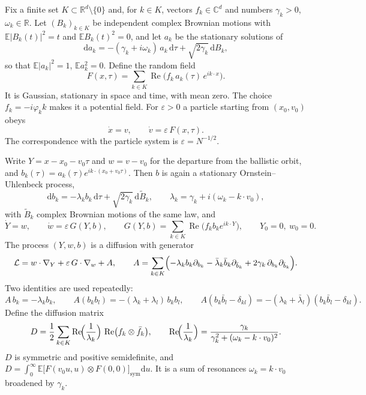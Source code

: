 \documentclass[11pt]{article}
\newcommand{\dd}{\mathrm{d}}
\newcommand{\E}{\mathbb{E}}
\newcommand{\eps}{\varepsilon}
\newcommand{\cL}{\mathcal{L}}
\renewcommand{\Re}{\operatorname{Re}}
\theoremstyle{remark}
\begin{document}
Fix a finite set $K\subset\mathbb{R}^d\setminus\{0\}$ and, for $k\in K$,
vectors $f_k\in\mathbb{C}^d$ and numbers $\gamma_k>0$, $\omega_k\in\mathbb{R}$.
Let $(B_k)_{k\in K}$ be independent complex Brownian motions with
$\E|B_k(t)|^2 = t$ and $\E B_k(t)^2 = 0$, and let $a_k$ be the stationary
solutions of
\[
  \dd a_k = -(\gamma_k + i\omega_k)\,a_k\,\dd\tau + \sqrt{2\gamma_k}\,\dd B_k ,
\]
so that $\E|a_k|^2 = 1$, $\E a_k^2 = 0$. Define the random field
\begin{equation}
  F(x,\tau) = \sum_{k\in K}\Re\bigl(f_k\,a_k(\tau)\,e^{ik\cdot x}\bigr).
\end{equation}
It is Gaussian, stationary in space and time, with mean zero. The choice
$f_k = -i\varphi_k k$ makes it a potential field. For $\eps>0$ a particle
starting from $(x_0,v_0)$ obeys
\begin{equation}
  \dot x = v, \qquad \dot v = \eps\,F(x,\tau).
\end{equation}
The correspondence with the particle system is $\eps = N^{-1/2}$.

Write $Y = x - x_0 - v_0\tau$ and $w = v - v_0$ for the departure from the
ballistic orbit, and $b_k(\tau) = a_k(\tau)e^{ik\cdot(x_0+v_0\tau)}$. Then
$b$ is again a stationary Ornstein--Uhlenbeck process,
\begin{equation}
  \dd b_k = -\lambda_k b_k\,\dd\tau + \sqrt{2\gamma_k}\,\dd\tilde B_k,
  \qquad \lambda_k = \gamma_k + i(\omega_k - k\cdot v_0),
\end{equation}
with $\tilde B_k$ complex Brownian motions of the same law, and
\begin{equation}
  \dot Y = w, \qquad \dot w = \eps\,G(Y,b), \qquad
  G(Y,b) = \sum_{k\in K}\Re\bigl(f_k b_k e^{ik\cdot Y}\bigr),
  \qquad Y_0 = 0,\ w_0 = 0 .
  \label{eq:Yw}
\end{equation}
The process $(Y,w,b)$ is a diffusion with generator
\begin{equation}
  \cL = w\cdot\nabla_Y + \eps\,G\cdot\nabla_w + A,
  \qquad
  A = \sum_{k\in K}\Bigl(-\lambda_k b_k\partial_{b_k}
      - \bar\lambda_k\bar b_k\partial_{\bar b_k}
      + 2\gamma_k\,\partial_{b_k}\partial_{\bar b_k}\Bigr).
\end{equation}
Two identities are used repeatedly:
\begin{equation}
  A\,b_k = -\lambda_k b_k,\qquad
  A(b_kb_l) = -(\lambda_k+\lambda_l)\,b_kb_l,\qquad
  A(b_k\bar b_l - \delta_{kl}) = -(\lambda_k+\bar\lambda_l)(b_k\bar b_l - \delta_{kl}).
  \label{eq:Aid}
\end{equation}
Define the diffusion matrix
\begin{equation}
  D = \frac12\sum_{k\in K}\Re\!\Bigl(\frac{1}{\lambda_k}\Bigr)\,
      \Re\bigl(f_k\otimes\bar f_k\bigr),
  \qquad
  \Re\!\Bigl(\frac{1}{\lambda_k}\Bigr)
  = \frac{\gamma_k}{\gamma_k^2 + (\omega_k - k\cdot v_0)^2} .
  \label{eq:D}
\end{equation}
$D$ is symmetric and positive semidefinite, and
$D = \int_0^\infty \E\bigl[F(v_0u,u)\otimes F(0,0)\bigr]_{\mathrm{sym}}\dd u$.
It is a sum of resonances $\omega_k = k\cdot v_0$ broadened by $\gamma_k$.
\end{document}
